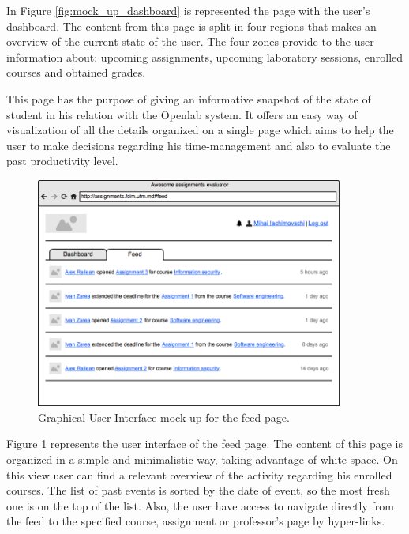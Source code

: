\documentclass[12pt,oneside,a4paper]{article}
\begin{document}
In Figure \ref{fig:mock_up_dashboard} is represented the page with the user's dashboard. The content from this page is split in four regions that makes an overview of the current state of the user. The four zones provide to the user information about: upcoming assignments, upcoming laboratory sessions, enrolled courses and obtained grades.

This page has the purpose of giving an informative snapshot of the state of student in his relation with the Openlab system. It offers an easy way of visualization of all the details organized on a single page which aims to help the user to make decisions regarding his time-management and also to evaluate the past productivity level.

\begin{figure}[!ht]
  \centering
    \includegraphics[width=0.9\textwidth]{pic/wireframe-feed.png}
    \caption{Graphical User Interface mock-up for the feed page.}
    \label{fig:mock_up_feed}
\end{figure}

Figure \ref{fig:mock_up_feed} represents the user interface of the feed page. The content of this page is organized in a simple and minimalistic way, taking advantage of white-space. On this view user can find a relevant overview of the activity regarding his enrolled courses. The list of past events is sorted by the date of event, so the most fresh one is on the top of the list. Also, the user have access to navigate directly from the feed to the specified course, assignment or professor's page by hyper-links.
\end{document}
